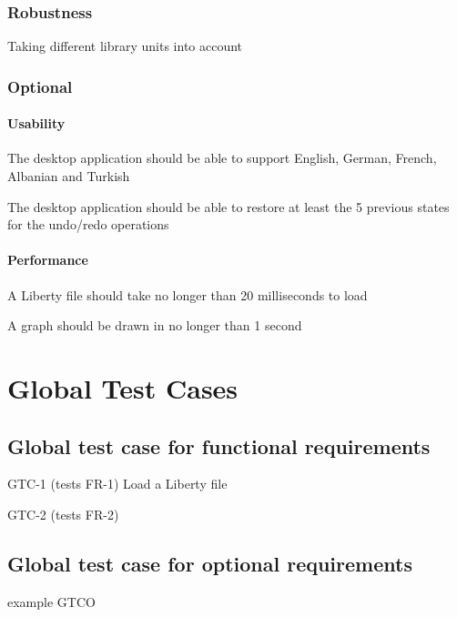 \documentclass[10pt,a4paper]{report}
\begin{document}
\subsection{Robustness}
\begin{NFR-Rob}
    \item Taking different library units into account
\end{NFR-Rob}

\subsection{Optional}
\subsubsection{Usability}
\begin{NFRO-Usability}
    \item The desktop application should be able to support English, German, French, Albanian and Turkish
    \item The desktop application should be able to restore at least the 5 previous states for the undo/redo operations 
\end{NFRO-Usability}

\subsubsection{Performance}
\begin{NFRO-Perf}
    \item A Liberty file should take no longer than 20 milliseconds to load
    \item A graph should be drawn in no longer than 1 second
\end{NFRO-Perf}

\chapter{Global Test Cases}

\section{Global test case for functional requirements}
\begin{GTC}
    \item GTC-1 (tests FR-1) Load a Liberty file
    \item GTC-2 (tests FR-2) 
\end{GTC}

\section{Global test case for optional requirements}
\begin{GTCO}
    \item example GTCO
\end{GTCO}
\end{document}
